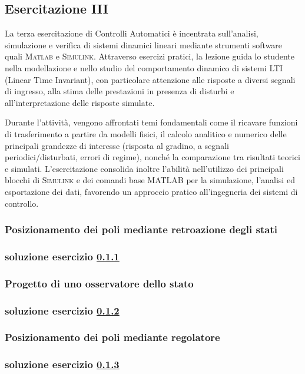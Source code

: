 \documentclass[../main.tex]{subfiles}
\begin{document}
\clearpage
\thispagestyle{empty}
\subsection{Esercitazione III}

La terza esercitazione di Controlli Automatici è incentrata sull’analisi, simulazione e verifica di sistemi dinamici lineari mediante strumenti software quali \textsc{Matlab} e \textsc{Simulink}. Attraverso esercizi pratici, la lezione guida lo studente nella modellazione e nello studio del comportamento dinamico di sistemi LTI (Linear Time Invariant), con particolare attenzione alle risposte a diversi segnali di ingresso, alla stima delle prestazioni in presenza di disturbi e all’interpretazione delle risposte simulate.

Durante l’attività, vengono affrontati temi fondamentali come il ricavare funzioni di trasferimento a partire da modelli fisici, il calcolo analitico e numerico delle principali grandezze di interesse (risposta al gradino, a segnali periodici/disturbati, errori di regime), nonché la comparazione tra risultati teorici e simulati. L’esercitazione consolida inoltre l’abilità nell’utilizzo dei principali blocchi di \textsc{Simulink} e dei comandi base MATLAB per la simulazione, l’analisi ed esportazione dei dati, favorendo un approccio pratico all’ingegneria dei sistemi di controllo.

\vspace*{1cm}
\subsubsection{Posizionamento dei poli mediante retroazione degli stati}
\label{lab31}


\subsubsection*{soluzione esercizio \ref{lab31}}

\vspace*{1cm}
\subsubsection{Progetto di uno osservatore dello stato}
\label{lab32}

\subsubsection*{soluzione esercizio \ref{lab32}}

\vspace*{1cm}
\subsubsection{Posizionamento dei poli mediante regolatore}
\label{lab33}

\subsubsection*{soluzione esercizio \ref{lab33}}
\end{document}
